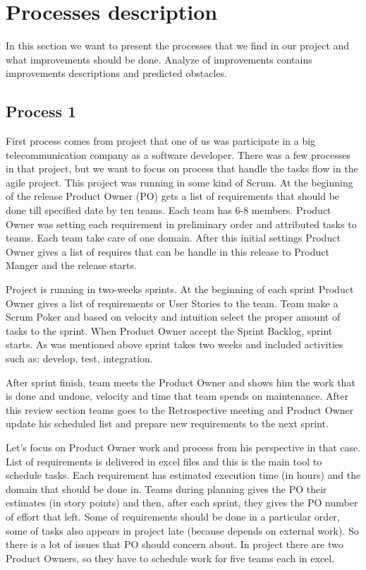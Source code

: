 \section{Processes description}

In this section we want to present the processes that we find in our project and what improvements should be done. Analyze of improvements contains improvements descriptions and predicted obstacles.

\subsection*{Process 1}

First process comes from project that one of us was participate in a big telecommunication company as a software developer. There was a few processes in that project, but we want to focus on process that handle the tasks flow in the agile project. This project was running in some kind of Scrum. At the beginning of the release Product Owner (PO) gets a list of requirements that should be done till specified date by ten teams. Each team has 6-8 members. Product Owner was setting each requirement in preliminary order and attributed tasks to teams. Each team take care of one domain. After this initial settings Product Owner gives a list of requires that can be handle in this release to Product Manger and the release starts.

Project is running in two-weeks sprints. At the beginning of each sprint Product Owner gives a list of requirements or User Stories to the team. Team make a Scrum Poker and based on velocity and intuition select the proper amount of tasks to the sprint. When Product Owner accept the Sprint Backlog, sprint starts. As was mentioned above sprint takes two weeks and included activities such as: develop, test, integration. 

After sprint finish, team meets the Product Owner and shows him the work that is done and undone, velocity and time that team spends on maintenance. After this review section teams goes to the Retrospective meeting and Product Owner update his scheduled list and prepare new requirements to the next sprint.

Let's focus on Product Owner work and process from his perspective in that case. List of requirements is delivered in excel files and this is the main tool to schedule tasks. Each requirement has estimated execution time (in hours) and the domain that should be done in. Teams during planning gives the PO their estimates (in story points) and then, after each sprint, they gives the PO number of effort that left.  Some of requirements should be done in a particular order, some of tasks also appears in project late (because depends on external work). So there is a lot of issues that PO should concern about. In project there are two Product Owners, so they have to schedule work for five teams each in excel.

